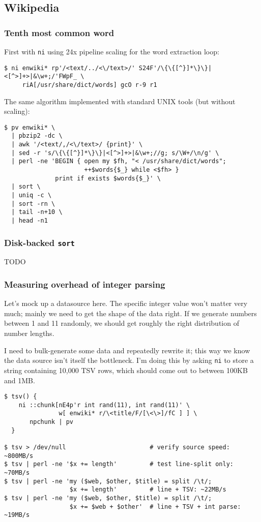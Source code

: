 \subsection{Wikipedia}
\subsubsection{Tenth most common word}
First with {\tt ni} using 24x pipeline scaling for the word extraction loop:

\begin{verbatim}
$ ni enwiki* rp'/<text/../<\/text>/' S24F'/\{\{[^}]*\}\}|<[^>]+>|&\w+;/'FWpF_ \
     riA[/usr/share/dict/words] gcO r-9 r1\end{verbatim}

The same algorithm implemented with standard UNIX tools (but without scaling):

\begin{verbatim}
$ pv enwiki* \
  | pbzip2 -dc \
  | awk '/<text/,/<\/text>/ {print}' \
  | sed -r 's/\{\{[^}]*\}\}|<[^>]+>|&\w+;//g; s/\W+/\n/g' \
  | perl -ne 'BEGIN { open my $fh, "< /usr/share/dict/words";
                      ++$words{$_} while <$fh> }
              print if exists $words{$_}' \
  | sort \
  | uniq -c \
  | sort -rn \
  | tail -n+10 \
  | head -n1\end{verbatim}

\subsubsection{Disk-backed {\tt sort}}
TODO

\subsubsection{Measuring overhead of integer parsing}
Let's mock up a datasource here. The specific integer value won't matter very
much; mainly we need to get the shape of the data right. If we generate numbers
between 1 and 11 randomly, we should get roughly the right distribution of
number lengths.

I need to bulk-generate some data and repeatedly rewrite it; this way we know
the data source isn't itself the bottleneck. I'm doing this by asking {\tt ni}
to store a string containing 10,000 TSV rows, which should come out to between
100KB and 1MB.

\begin{verbatim}
$ tsv() {
    ni ::chunk[nE4p'r int rand(11), int rand(11)' \
               w[ enwiki* r/\<title/F/[\<\>]/fC ] ] \
       npchunk | pv
  }

$ tsv > /dev/null                       # verify source speed: ~800MB/s
$ tsv | perl -ne '$x += length'         # test line-split only: ~70MB/s
$ tsv | perl -ne 'my ($web, $other, $title) = split /\t/;
                  $x += length'         # line + TSV: ~22MB/s
$ tsv | perl -ne 'my ($web, $other, $title) = split /\t/;
                  $x += $web + $other'  # line + TSV + int parse: ~19MB/s\end{verbatim}

